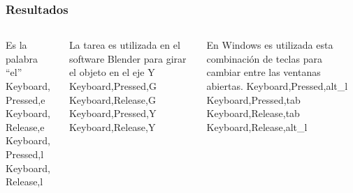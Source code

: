 \begin{frame}
\frametitle{Resultados}

\begin{columns}[T]
		\begin{column}{.33\textwidth}
			\begin{block}{\small{Es la palabra ``el''}}
				\centering
				Keyboard,Pressed,e	\\
				Keyboard,Release,e	\\
				Keyboard,Pressed,l	\\
				Keyboard,Release,l	\\
			\end{block}
		\end{column}

		\begin{column}{.33\textwidth}
			\begin{block}{\small{ La tarea es utilizada en el software
			 Blender para girar el objeto en el eje Y}}
				\centering
				Keyboard,Pressed,G\\
				Keyboard,Release,G\\
				Keyboard,Pressed,Y\\
				Keyboard,Release,Y\\
			\end{block}
		\end{column}
		
		\begin{column}{.33\textwidth}
			\begin{block}{\small{En Windows es utilizada esta combinaci\'on
			 de teclas para cambiar entre las ventanas abiertas.}}	
				\centering
				Keyboard,Pressed,alt\_l	\\
				Keyboard,Pressed,tab	\\
				Keyboard,Release,tab	\\
				Keyboard,Release,alt\_l	\\
			\end{block}
		\end{column}
		
	\end{columns}
\end{frame}



